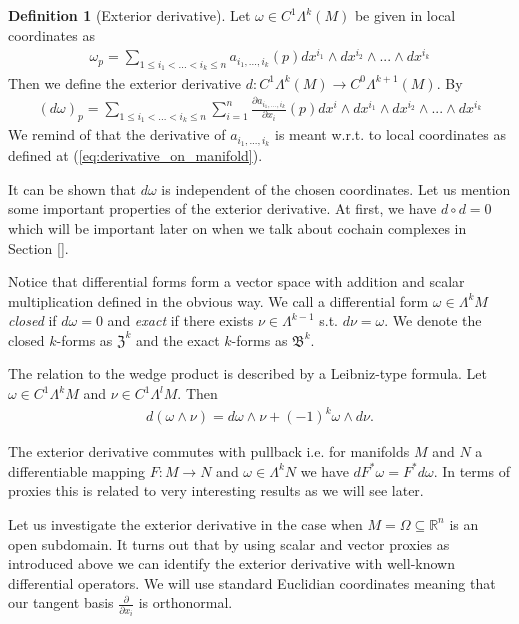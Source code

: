 \documentclass[12pt,a4paper]{article}
\numberwithin{equation}{subsection}
\numberwithin{lemma}{subsection}
\theoremstyle{definition}
\newtheorem{definition}[lemma]{Definition}
\newcommand{\real}{\mathbb{R}}
\begin{document}
\begin{definition}[Exterior derivative]
    Let $\omega \in C^1\Lambda^k (M)$ be given in local coordinates as
    \begin{align*}
        \omega_p = \sum\limits_{1\leq i_1 < ... < i_k \leq n} 
            a_{i_1,...,i_k}(p) dx^{i_1} \wedge dx^{i_2} \wedge ... \wedge dx^{i_k}
    \end{align*}
    Then we define the exterior derivative $d: C^1 \Lambda^{k}(M) \rightarrow 
    C^0\Lambda^{k+1}(M)$. By
    \begin{align*}
        (d\omega)_p = \sum\limits_{1\leq i_1 < ... < i_k \leq n} \sum\limits_{i=1}^n
        \frac{\partial a_{i_1,...,i_k}}{\partial x_i}(p) 
        dx^i \wedge dx^{i_1} \wedge dx^{i_2} \wedge ... \wedge dx^{i_k}
    \end{align*}
    We remind of that the derivative of $a_{i_1,...,i_k}$ is meant w.r.t. 
    to local coordinates as defined at (\ref{eq:derivative_on_manifold}).
\end{definition}
It can be shown that $d\omega$ is independent of the chosen coordinates. 
Let us mention some important properties of the exterior derivative. 
At first, we have $d\circ d = 0$ which will be important later on 
when we talk about cochain complexes in Section \ref{}.

Notice that differential forms form a vector space with addition and scalar 
multiplication defined in the obvious way. 
We call a differential form $\omega \in \Lambda^k M$ 
\textit{closed} if $d\omega = 0$ and \textit{exact}
if there exists $\nu \in \Lambda^{k-1}$ s.t. $d\nu = \omega$.
We denote the closed $k$-forms as $\mathfrak{Z}^k$ and the exact 
$k$-forms as $\mathfrak{B}^k$.

The relation to the wedge product is described by a Leibniz-type formula. 
Let $\omega \in C^1 \Lambda^k M$ and $\nu \in C^1 \Lambda^l M$. Then
\begin{align}
    d (\omega \wedge \nu) = d\omega \wedge \nu + (-1)^k \omega \wedge d\nu.
    \label{eq:leibniz_formula}
\end{align}

The exterior derivative commutes with pullback i.e. 
for manifolds $M$ and $N$ a differentiable mapping $F:M \rightarrow N$ 
and $\omega \in \Lambda^k N$ we have $dF^* \omega = F^* d\omega$. 
In terms of proxies this is related to very interesting results as we will 
see later. 


Let us investigate the exterior derivative in the case when 
$M = \Omega \subseteq \real^n$ is an open subdomain. It turns out that by using 
scalar and vector proxies as introduced above we can identify the exterior 
derivative with well-known differential operators. We will use standard 
Euclidian coordinates meaning that our tangent basis $\frac{\partial}{\partial x_i}$
is orthonormal. 
\end{document}
